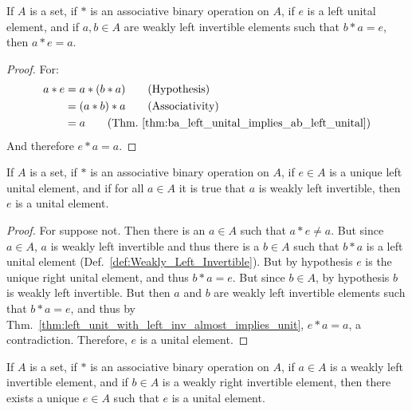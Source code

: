     \begin{theorem}
        \label{thm:left_unit_with_left_inv_almost_implies_unit}%
        If $A$ is a set, if $*$ is an associative binary operation on $A$, if
        $e$ is a left unital element, and if $a,b\in{A}$ are weakly left
        invertible elements such that $b*a=e$, then $a*e=a$.
    \end{theorem}
    \begin{proof}
        For:
        \begin{align}
            a*e&=a*(b*a)
            \tag{Hypothesis}\\
            &=(a*b)*a
            \tag{Associativity}\\
            &=a
            \tag{Thm.~\ref{thm:ba_left_unital_implies_ab_left_unital}}
        \end{align}
        And therefore $e*a=a$.
    \end{proof}
    \begin{theorem}
        \label{thm:left_unit_with_left_inv_implies_unit}%
        If $A$ is a set, if $*$ is an associative binary operation on $A$, if
        $e\in{A}$ is a unique left unital element, and if for all $a\in{A}$ it
        is true that $a$ is weakly left invertible, then $e$ is a unital
        element.
    \end{theorem}
    \begin{proof}
        For suppose not. Then there is an $a\in{A}$ such that $a*e\ne{a}$. But
        since $a\in{A}$, $a$ is weakly left invertible and thus there is a
        $b\in{A}$ such that $b*a$ is a left unital element
        (Def.~\ref{def:Weakly_Left_Invertible}). But by hypothesis $e$ is the
        unique right unital element, and thus $b*a=e$. But since $b\in{A}$,
        by hypothesis $b$ is weakly left invertible. But then $a$ and $b$ are
        weakly left invertible elements such that $b*a=e$, and thus by
        Thm.~\ref{thm:left_unit_with_left_inv_almost_implies_unit}, $e*a=a$,
        a contradiction. Therefore, $e$ is a unital element.
    \end{proof}
    \begin{theorem}
        \label{thm:existence_of_weak_left_and_weak_right_implies_unital}%
        If $A$ is a set, if $*$ is an associative binary operation on $A$, if
        $a\in{A}$ is a weakly left invertible element, and if $b\in{A}$ is a
        weakly right invertible element, then there exists a unique $e\in{A}$
        such that $e$ is a unital element.
    \end{theorem}

